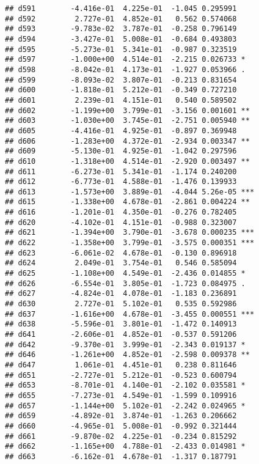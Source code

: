 \documentclass[
]{article}
\begin{document}
\begin{verbatim}
## d591        -4.416e-01  4.225e-01  -1.045 0.295991    
## d592         2.727e-01  4.852e-01   0.562 0.574068    
## d593        -9.783e-02  3.787e-01  -0.258 0.796149    
## d594        -3.427e-01  5.008e-01  -0.684 0.493803    
## d595        -5.273e-01  5.341e-01  -0.987 0.323519    
## d597        -1.000e+00  4.514e-01  -2.215 0.026733 *  
## d598        -8.042e-01  4.173e-01  -1.927 0.053966 .  
## d599        -8.093e-02  3.807e-01  -0.213 0.831654    
## d600        -1.818e-01  5.212e-01  -0.349 0.727210    
## d601         2.239e-01  4.151e-01   0.540 0.589502    
## d602        -1.199e+00  3.799e-01  -3.156 0.001601 ** 
## d603        -1.030e+00  3.745e-01  -2.751 0.005940 ** 
## d605        -4.416e-01  4.925e-01  -0.897 0.369948    
## d606        -1.283e+00  4.372e-01  -2.934 0.003347 ** 
## d609        -5.130e-01  4.925e-01  -1.042 0.297596    
## d610        -1.318e+00  4.514e-01  -2.920 0.003497 ** 
## d611        -6.273e-01  5.341e-01  -1.174 0.240200    
## d612        -6.773e-01  4.588e-01  -1.476 0.139933    
## d613        -1.573e+00  3.889e-01  -4.044 5.26e-05 ***
## d615        -1.338e+00  4.678e-01  -2.861 0.004224 ** 
## d616        -1.201e-01  4.350e-01  -0.276 0.782405    
## d620        -4.102e-01  4.151e-01  -0.988 0.323007    
## d621        -1.394e+00  3.790e-01  -3.678 0.000235 ***
## d622        -1.358e+00  3.799e-01  -3.575 0.000351 ***
## d623        -6.061e-02  4.678e-01  -0.130 0.896918    
## d624         2.049e-01  3.754e-01   0.546 0.585094    
## d625        -1.108e+00  4.549e-01  -2.436 0.014855 *  
## d626        -6.554e-01  3.805e-01  -1.723 0.084975 .  
## d627        -4.824e-01  4.078e-01  -1.183 0.236891    
## d630         2.727e-01  5.102e-01   0.535 0.592986    
## d637        -1.616e+00  4.678e-01  -3.455 0.000551 ***
## d638        -5.596e-01  3.801e-01  -1.472 0.140913    
## d641        -2.606e-01  4.852e-01  -0.537 0.591206    
## d642        -9.370e-01  3.999e-01  -2.343 0.019137 *  
## d646        -1.261e+00  4.852e-01  -2.598 0.009378 ** 
## d647         1.061e-01  4.451e-01   0.238 0.811646    
## d651        -2.727e-01  5.212e-01  -0.523 0.600794    
## d653        -8.701e-01  4.140e-01  -2.102 0.035581 *  
## d655        -7.273e-01  4.549e-01  -1.599 0.109916    
## d657        -1.144e+00  5.102e-01  -2.242 0.024965 *  
## d659        -4.892e-01  3.874e-01  -1.263 0.206662    
## d660        -4.965e-01  5.008e-01  -0.992 0.321444    
## d661        -9.870e-02  4.225e-01  -0.234 0.815292    
## d662        -1.165e+00  4.788e-01  -2.433 0.014981 *  
## d663        -6.162e-01  4.678e-01  -1.317 0.187791    

\end{verbatim}
\end{document}
